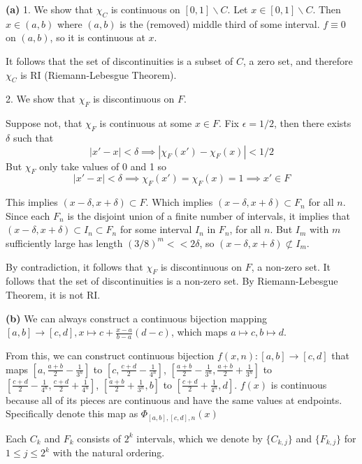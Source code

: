 \documentclass[a4paper, 12pt]{article}
\begin{document}
\begin{solution}
    \textbf{(a)}  1. We show that $\chi_C$ is continuous on $[0, 1] \backslash C$. Let $x \in [0, 1] \backslash C$. Then $x \in (a, b)$ where $(a, b)$ is the (removed) middle third of some interval. $f \equiv 0$ on $(a, b)$, so it is continuous at $x$.

    It follows that the set of discontinuities is a subset of $C$, a zero set, and therefore $\chi_C$ is RI (Riemann-Lebesgue Theorem).

    2. We show that $\chi_F$ is discontinuous on $F$.

    Suppose not, that $\chi_F$ is continuous at some $x \in F$. Fix $\epsilon = 1/2$, then there exists $\delta$ such that \[
        |x' - x| < \delta \implies |\chi_F(x') - \chi_F(x)| < 1/2
    \]
    But $\chi_F$ only take values of 0 and 1 so \[
        |x' - x| < \delta \implies \chi_F(x') = \chi_F(x) = 1 \implies x' \in F
    \]

    This implies $(x - \delta, x + \delta) \subset F$. Which implies $(x - \delta, x + \delta) \subset F_n$ for all $n$. Since each $F_n$ is the disjoint union of a finite number of intervals, it implies that $(x - \delta, x + \delta) \subset I_n \subset F_n$ for some interval $I_n$ in $F_n$, for all $n$. But $I_m$ with $m$ sufficiently large has length $(3/8)^m << 2 \delta$, so $(x - \delta, x + \delta) \not \subset I_m$. \contra

    By contradiction, it follows that $\chi_F$ is discontinuous on $F$, a non-zero set. It follows that the set of discontinuities is a non-zero set. By Riemann-Lebesgue Theorem, it is not RI.

    \textbf{(b)} We can always construct a continuous bijection mapping $[a, b] \to [c, d], x \mapsto c + \frac{x-a}{b-a}(d-c)$, which maps $a \mapsto c, b \mapsto d$.

    From this, we can construct continuous bijection $f(x, n): [a, b] \to [c, d]$ that maps $[a, \frac{a+b}{2} - \frac{1}{3^n}]$ to $[c, \frac{c+d}{2} - \frac{1}{4^n}]$, $[\frac{a+b}{2} - \frac{1}{3^n}, \frac{a+b}{2} + \frac{1}{3^n}]$ to $[\frac{c+d}{2} - \frac{1}{4^n}, \frac{c+d}{2} + \frac{1}{4^n}]$, $[\frac{a+b}{2} + \frac{1}{3^n}, b]$ to $[\frac{c+d}{2} + \frac{1}{4^n}, d]$. $f(x)$ is continuous because all of its pieces are continuous and have the same values at endpoints. Specifically denote this map as $\Phi_{[a, b], [c, d], n}(x)$

    Each $C_k$ and $F_k$ consists of $2^k$ intervals, which we denote by $\{C_{k, j}\}$ and $\{F_{k, j}\}$ for $1 \leq j \leq 2^k$ with the natural ordering.


\end{solution}
\end{document}
